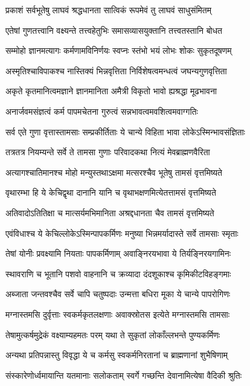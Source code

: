 \twolineshloka
{प्रकाशं सर्वभूतेषु लाघवं श्रद्धधानता}
{सात्विकं रूपमेवं तु लाघवं साधुसंमितम्}


\twolineshloka
{एतेषां गुणतत्त्वानि वक्ष्यन्ते तत्त्वहेतुभिः}
{समासव्यासयुक्तानि तत्त्वतस्तानि बोधत}


\twolineshloka
{सम्मोहो ज्ञानमत्यागः कर्मणामविनिर्णयः}
{स्वप्नः स्तंभो भयं लोभः शोकः सुकृतदूषणम्}


\twolineshloka
{अस्मृतिश्चाविपाकश्च नास्तिक्यं भिन्नवृत्तिता}
{निर्विशेषत्वमन्धत्वं जघन्यगुणवृत्तिता}


\twolineshloka
{अकृते कृतमानित्वमज्ञाने ज्ञानमानिता}
{अमैत्री विकृतो भावो ह्यश्रद्धा मूढभावना}


\twolineshloka
{अनार्जवमसंज्ञत्वं कर्म पापमचेतना}
{गुरुत्वं सन्नभावत्वमवशित्वमवाग्गतिः}


\twolineshloka
{सर्व एते गुणा वृत्तास्तामसाः सम्प्रकीर्तिताः}
{ये चान्ये विहिता भावा लोकेऽस्मिन्भावसंज्ञिताः}


\twolineshloka
{तत्रतत्र नियम्यन्ते सर्वे ते तामसा गुणाः}
{परिवादकथा नित्यं मेवब्राह्मणवैरिता}


\twolineshloka
{अत्यागश्चातिमानश्च मोहो मन्युस्तथाऽक्षमा}
{मत्सरश्चैव भूतेषु तामसं वृत्तमिष्यते}


\twolineshloka
{वृथारम्भा हि ये केचिद्वृथा दानानि यानि च}
{वृथाभक्षणमित्येतत्तामसं वृत्तमिष्यते}


\twolineshloka
{अतिवादोऽतितिक्षा च मात्सर्यमभिमानिता}
{अश्रद्दधानता चैव तामसं वृत्तमिष्यते}


\twolineshloka
{एवंविधाश्च ये केचिल्लोकेऽस्मिन्पापकर्मिणः}
{मनुष्या भिन्नमर्यादास्ते सर्वे तामसाः स्मृताः}


\threelineshloka
{तेषां योनीः प्रवक्ष्यामि नियताः पापकर्मिणाम्}
{अवाङ्निरयभावा ये तिर्यङ्निरयगामिनः}
{}


\twolineshloka
{स्थावराणि च भूतानि पशवो वाहनानि च}
{क्रव्यादा दंदशूकाश्च कृमिकीटविहङ्गमाः}


\twolineshloka
{अब्जाता जन्तवश्चैव सर्वे चापि चतुष्पदाः}
{उन्मत्ता बधिरा मूका ये चान्ये पापरोगिणः}


\twolineshloka
{मग्नास्तमसि दुर्वृत्ताः स्वकर्मकृतलक्षणाः}
{अवाक्स्रोतस इत्येते मग्नास्तमसि तामसाः}


\twolineshloka
{तेषामुत्कर्षमुद्रेकं वक्ष्याम्यहमतः परम्}
{यथा ते सुकृतां लोकाँल्लभन्ते पुण्यकर्मिणः}


\twolineshloka
{अन्यथा प्रतिपन्नास्तु विवृद्धा ये च कर्मसु}
{स्वकर्मनिरतानां च ब्राह्मणानां शुभैषिणाम्}


\twolineshloka
{संस्कारेणोर्ध्वमायान्ति यतमानाः सलोकताम्}
{स्वर्गे गच्छन्ति देवानामित्येषा वैदिकी श्रुतिः}


